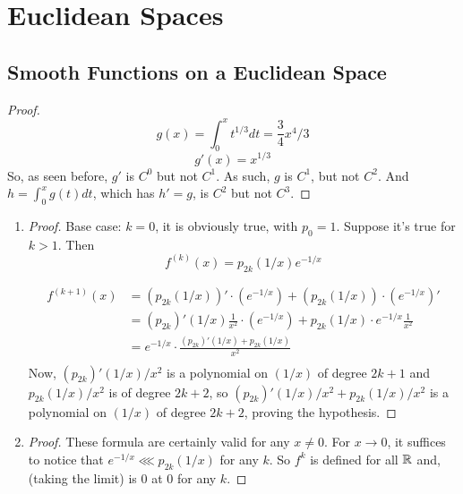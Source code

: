 \chapter{Euclidean Spaces}
\section{Smooth Functions on a Euclidean Space}
\begin{problem}
\end{problem}

\begin{proof}
	$$g(x) = \int_{0}^{x} t^{1/3}dt = \frac{3}{4}x^4/3$$
	$$g'(x) = x^{1/3}$$
	So, as seen before, $g'$ is $C^0$ but not $C^1$. As such, $g$ is $C^1$, but not $C^2$. And
	$h = \int_{0}^{x} g(t) dt$, which has $h' = g$, is $C^2$ but not $C^3$.
\end{proof}

\begin{problem}
\end{problem}

\begin{enumerate}[label=(\alph*)]
	\item
	      \begin{proof}
		      Base case: $k = 0$, it is obviously true, with $p_{0} = 1$. Suppose it's true for $k > 1$. Then
		      $$f^{(k)}(x) = p_{2k}(1/x)e^{-1/x} $$

		      \begin{align*}
			      f^{(k+1)}(x) & = (p_{2k}(1/x))' \cdot (e^{-1/x}) + (p_{2k}(1/x))\cdot(e^{-1/x})'                     \\
			                   & = (p_{2k})'(1/x)\frac{1}{x^2}\cdot(e^{-1/x}) + p_{2k}(1/x)\cdot e^{-1/x}\frac{1}{x^2} \\
			                   & =  e^{-1/x} \cdot \frac{(p_{2k})'(1/x) + p_{2k}(1/x)}{x^2}                            \\
		      \end{align*}
		      Now, $(p_{2k})'(1/x)/x^2$ is a polynomial on $(1/x)$ of degree $2k + 1$ and $p_{2k}(1/x)/x^2$ is of degree
		      $2k + 2$, so $(p_{2k})'(1/x)/x^2 + p_{2k}(1/x)/x^2$ is a polynomial on $(1/x)$ of degree $2k + 2$, proving the hypothesis.
	      \end{proof}
	\item \begin{proof}
		      These formula are certainly valid for any $x \neq 0$. For $x \to 0$, it suffices to notice that $e^{-1/x} \lll p_{2k}(1/x)$ for any $k$.
		      So $f^{k}$ is defined for all $\mathbb{R}$ and, (taking the limit) is $0$ at $0$ for any $k$.
	      \end{proof}
\end{enumerate}

